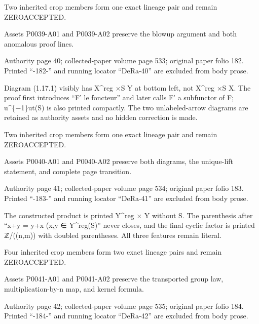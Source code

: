 \documentclass[11pt,a4paper]{article}
\begin{document}
Two inherited crop members form one exact lineage pair and remain ZERO\textunderscore{}ACCEPTED.

Assets P0039-A01 and P0039-A02 preserve the blowup argument and both anomalous proof lines.


\par\medskip
\hypertarget{D018-P0040}{}
\par\smallskip
Authority page 40; collected-paper volume page 533; original paper folio 182. Printed “-182-” and running locator “DeRa-40” are excluded from body prose.

Diagram (1.17.1) visibly has X\textasciicircum{}reg ×\textunderscore{}S Y at bottom left, not X\textasciicircum{}reg ×\textunderscore{}S X. The proof first introduces “F' le foncteur” and later calls F' a subfunctor of F; u\textasciicircum{}\{−1\}ut(S) is also printed compactly. The two unlabeled-arrow diagrams are retained as authority assets and no hidden correction is made.

Two inherited crop members form one exact lineage pair and remain ZERO\textunderscore{}ACCEPTED.

Assets P0040-A01 and P0040-A02 preserve both diagrams, the unique-lift statement, and complete page transition.


\par\medskip
\hypertarget{D018-P0041}{}
\par\smallskip
Authority page 41; collected-paper volume page 534; original paper folio 183. Printed “-183-” and running locator “DeRa-41” are excluded from body prose.

The constructed product is printed Y\textasciicircum{}reg × Y without \textunderscore{}S. The parenthesis after “x+y = y+x (x,y ∈ Y\textasciicircum{}reg(S)” never closes, and the final cyclic factor is printed ℤ/((n,m)) with doubled parentheses. All three features remain literal.

Four inherited crop members form two exact lineage pairs and remain ZERO\textunderscore{}ACCEPTED.

Assets P0041-A01 and P0041-A02 preserve the transported group law, multiplication-by-n map, and kernel formula.


\par\medskip
\hypertarget{D018-P0042}{}
\par\smallskip
Authority page 42; collected-paper volume page 535; original paper folio 184. Printed “-184-” and running locator “DeRa-42” are excluded from body prose.
\end{document}
